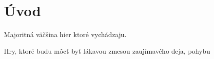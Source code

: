 \section*{Úvod}
\paragraph{}

Majoritná väčšina hier ktoré vychádzaju.

Hry, ktoré budu môcť byť lákavou zmesou zaujímavého deja, pohybu
